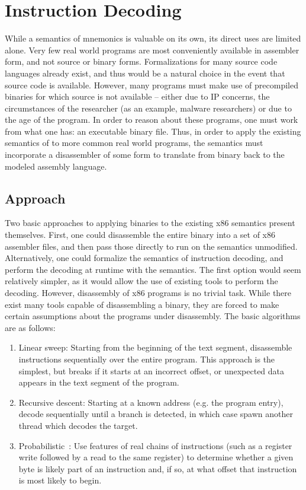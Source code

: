 \section{Instruction Decoding}

While a semantics of \GENISA mnemonics is valuable on its own, its direct uses are limited alone.  Very few real world programs are most conveniently available in assembler form, and not source or binary forms.   Formalizations for many source code languages already exist, and thus would be a natural choice in the event that source code is available.  However, many programs must make use of precompiled binaries for which source is not available – either due to IP concerns, the circumstances of the researcher (as an example, malware researchers) or due to the age of the program.  In order to reason about these programs, one must work from what one has: an executable binary file.  Thus, in order to apply the existing semantics of \GENISA to more common real world programs, the semantics must incorporate a disassembler of some form to translate from binary back to the modeled assembly language.
\subsection{Approach}
Two basic approaches to applying binaries to the existing x86 semantics present themselves.  First, one could disassemble the entire binary into a set of x86 assembler files, and then pass those directly to run on the semantics unmodified.  Alternatively, one could formalize the semantics of instruction decoding, and perform the decoding at runtime with the semantics.  The first option would seem relatively simpler, as it would allow the use of existing tools to perform the decoding.  However, disassembly of x86 programs is no trivial task.  While there exist many tools capable of disassembling a binary, they are forced to make certain assumptions about the programs under disassembly.  The basic algorithms are as follows:

\begin{enumerate}
    \item Linear sweep: Starting from the beginning of the text segment, disassemble instructions sequentially over the entire program.  This approach is the simplest, but breaks if it starts at an incorrect offset, or unexpected data appears in the text segment of the program.
    \item Recursive descent: Starting at a known address (e.g. the program entry), decode sequentially until a branch is detected, in which case spawn another thread which decodes the target.
    \item Probabilistic~\cite{Miller:2019}: Use features of real chains of instructions (such as a register write followed by a read to the same register) to determine whether a given byte is likely part of an instruction and, if so, at what offset that instruction is most likely to begin.
\end{enumerate}

